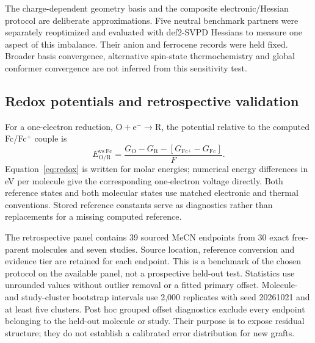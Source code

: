 \documentclass[11pt]{article}
\begin{document}
The charge-dependent geometry basis and the composite electronic/Hessian protocol are deliberate approximations. Five neutral benchmark partners were separately reoptimized and evaluated with def2-SVPD Hessians to measure one aspect of this imbalance. Their anion and ferrocene records were held fixed. Broader basis convergence, alternative spin-state thermochemistry and global conformer convergence are not inferred from this sensitivity test.

\subsection{Redox potentials and retrospective validation}
For a one-electron reduction, $\mathrm{O+e^-\rightarrow R}$, the potential relative to the computed Fc/Fc$^+$ couple is
\begin{equation}
E_{\mathrm{O/R}}^{\mathrm{vs\ Fc}}=
\frac{G_{\mathrm O}-G_{\mathrm R}-[G_{\mathrm{Fc^+}}-G_{\mathrm{Fc}}]}{F}.
\label{eq:redox}
\end{equation}
Equation~\ref{eq:redox} is written for molar energies; numerical energy differences in eV per molecule give the corresponding one-electron voltage directly. Both reference states and both molecular states use matched electronic and thermal conventions. Stored reference constants serve as diagnostics rather than replacements for a missing computed reference.

The retrospective panel contains 39 sourced MeCN endpoints from 30 exact free-parent molecules and seven studies. Source location, reference conversion and evidence tier are retained for each endpoint. This is a benchmark of the chosen protocol on the available panel, not a prospective held-out test. Statistics use unrounded values without outlier removal or a fitted primary offset. Molecule- and study-cluster bootstrap intervals use 2,000 replicates with seed 20261021 and at least five clusters. Post hoc grouped offset diagnostics exclude every endpoint belonging to the held-out molecule or study. Their purpose is to expose residual structure; they do not establish a calibrated error distribution for new grafts.
\end{document}
